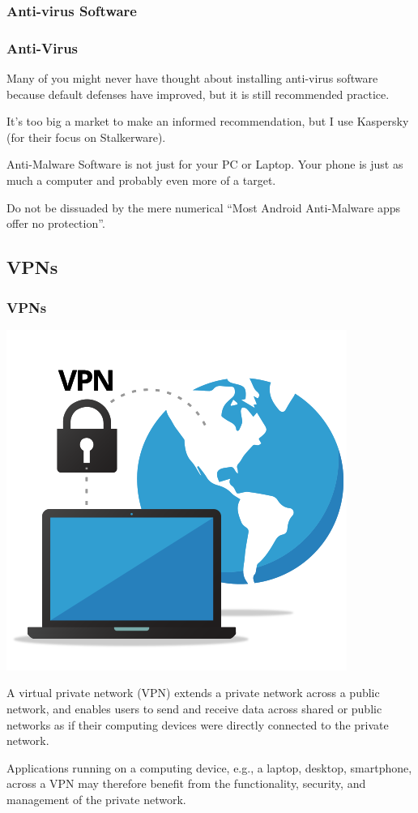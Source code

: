 \documentclass[aspectratio=169,dvipsnames]{beamer}
\begin{document}
\subsubsection{Anti-virus Software}

\begin{frame}
\frametitle{Anti-Virus}
Many of you might never have thought about installing anti-virus software because default defenses have improved, but it is still recommended practice.
\pause\bigskip

It's too big a market to make an informed recommendation, but I use Kaspersky (for their focus on Stalkerware).
\pause\bigskip

Anti-Malware Software is not just for your PC or Laptop. Your phone is just as much a computer and probably even more of a target.
\pause

Do not be dissuaded by the mere numerical ``Most Android Anti-Malware apps offer no protection''.
\end{frame}

\subsection{VPNs}

\begin{frame}
\frametitle{VPNs}

\begin{minipage}{0.5\textwidth}
\begin{center}
\includegraphics[scale=0.4]{images/vpn.png} 
\end{center}
\end{minipage}%
\begin{minipage}{0.5\textwidth}
A virtual private network (VPN) extends a private network across a public network, and enables users to send and receive data across shared or public networks as if their computing devices were directly connected to the private network.
\bigskip

Applications running on a computing device, e.g., a laptop, desktop, smartphone, across a VPN may therefore benefit from the functionality, security, and management of the private network.
\end{minipage}
\end{frame}
\end{document}
